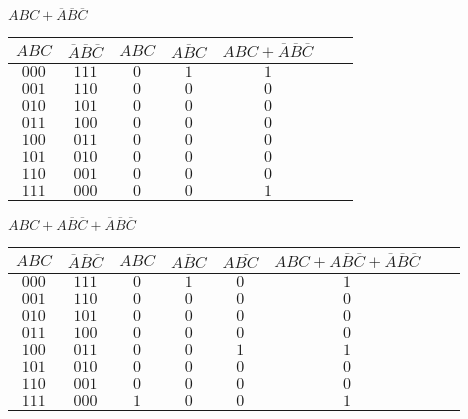 \documentclass[12pt,largemargins]{homework}
\date{Septemeber 6, 2018}
\begin{document}
\maketitle
{}
\begin{alphaparts}
\item
$ABC + \overline{A} \overline{B} \overline{C}$ \\

\begin{tabular}{|c|c|c|c|c|c|c|}
\hline
$ABC$ & $\overline{A}\overline{B}\overline{C}$ & $ABC$ & $\overline{ABC}$ & $ABC + \overline{A} \overline{B} \overline{C}$ \\
\hline
$000$ & $111$ & $ 0 $ & $ 1$ & $ 1$ \\
$001$ & $110$ & $ 0 $ & $ 0$ & $ 0$ \\
$010$ & $101$ & $ 0 $ & $ 0$ & $ 0$ \\
$011$ & $100$ & $ 0 $ & $ 0$ & $ 0$ \\
$100$ & $011$ & $ 0 $ & $ 0$ & $ 0$ \\
$101$ & $010$ & $ 0 $ & $ 0$ & $ 0$ \\
$110$ & $001$ & $ 0 $ & $ 0$ & $ 0$ \\
$111$ & $000$ & $ 0 $ & $ 0$ & $ 1$ \\
\hline

\end{tabular}

\item
$ABC + A  \overline{B} \overline{C} + \overline{A} \overline{B} \overline{C}$ \\

\begin{tabular}{|c|c|c|c|c|c|c|c|}
\hline
$ABC$ & $\overline{A}\overline{B}\overline{C}$ & $ABC$ & $\overline{ABC}$ & $A\overline{BC}$ & $ABC + A  \overline{B} \overline{C} + \overline{A} \overline{B} \overline{C}$ \\
\hline
$000$ & $111$ & $ 0 $ & $ 1$ & $ 0$ & $ 1$ \\
$001$ & $110$ & $ 0 $ & $ 0$ & $ 0$ & $ 0$\\
$010$ & $101$ & $ 0 $ & $ 0$ & $ 0$ & $ 0$ \\
$011$ & $100$ & $ 0 $ & $ 0$ & $ 0$ & $ 0$ \\
$100$ & $011$ & $ 0 $ & $ 0$ & $ 1$ & $ 1$ \\
$101$ & $010$ & $ 0 $ & $ 0$ & $ 0$ & $ 0$ \\
$110$ & $001$ & $ 0 $ & $ 0$ & $ 0$ & $ 0$ \\
$111$ & $000$ & $ 1 $ & $ 0$ & $ 0$ & $ 1$ \\
\hline


\end{tabular}
\end{alphaparts}
\end{document}
